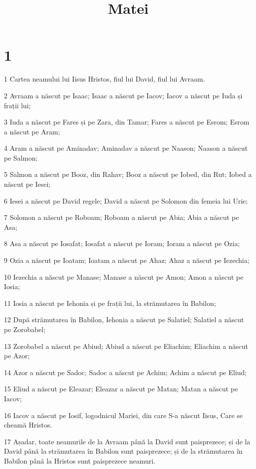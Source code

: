 

\title{Matei}


\chapter{1}

\par 1 Cartea neamului lui Iisus Hristos, fiul lui David, fiul lui Avraam.
\par 2 Avraam a născut pe Isaac; Isaac a născut pe Iacov; Iacov a născut pe Iuda și frații lui;
\par 3 Iuda a născut pe Fares și pe Zara, din Tamar; Fares a născut pe Esrom; Esrom a născut pe Aram;
\par 4 Aram a născut pe Aminadav; Aminadav a născut pe Naason; Naason a născut pe Salmon;
\par 5 Salmon a născut pe Booz, din Rahav; Booz a născut pe Iobed, din Rut; Iobed a născut pe Iesei;
\par 6 Iesei a născut pe David regele; David a născut pe Solomon din femeia lui Urie;
\par 7 Solomon a născut pe Roboam; Roboam a născut pe Abia; Abia a născut pe Asa;
\par 8 Asa a născut pe Iosafat; Iosafat a născut pe Ioram; Ioram a născut pe Ozia;
\par 9 Ozia a născut pe Ioatam; Ioatam a născut pe Ahaz; Ahaz a născut pe Iezechia;
\par 10 Iezechia a născut pe Manase; Manase a născut pe Amon; Amon a născut pe Iosia;
\par 11 Iosia a născut pe Iehonia și pe frații lui, la strămutarea în Babilon;
\par 12 După strămutarea în Babilon, Iehonia a născut pe Salatiel; Salatiel a născut pe Zorobabel;
\par 13 Zorobabel a născut pe Abiud; Abiud a născut pe Eliachim; Eliachim a născut pe Azor;
\par 14 Azor a născut pe Sadoc; Sadoc a născut pe Achim; Achim a născut pe Eliud;
\par 15 Eliud a născut pe Eleazar; Eleazar a născut pe Matan; Matan a născut pe Iacov;
\par 16 Iacov a născut pe Iosif, logodnicul Mariei, din care S-a născut Iisus, Care se cheamă Hristos.
\par 17 Așadar, toate neamurile de la Avraam până la David sunt paisprezece; și de la David până la strămutarea în Babilon sunt paisprezece; și de la strămutarea în Babilon până la Hristos sunt paisprezece neamuri.
